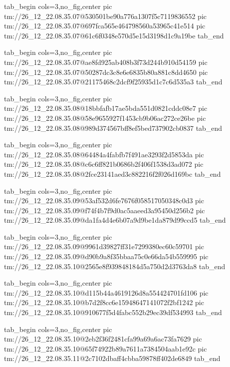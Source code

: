  
 
 
 
 

\qqSecCmtScr


\ifcmt
  tab_begin cols=3,no_fig,center
    pic tm://26_12_22.08.35.07@530501be90a776a1307f5c7119836552
    pic tm://26_12_22.08.35.07@697fca565e464798560a53965c41e514
    pic tm://26_12_22.08.35.07@61c6f0348e570d5e15d3198d1c9a19be
  tab_end
\fi


\ifcmt
  tab_begin cols=3,no_fig,center
    pic tm://26_12_22.08.35.07@ae8fd925ab408b3f73d244b910d54159
    pic tm://26_12_22.08.35.07@50287dc3c8e6e6835b80a881c8dd4650
    pic tm://26_12_22.08.35.07@21175468c2dcf9f25935d1c7c6d535a3
  tab_end
\fi


\ifcmt
  tab_begin cols=3,no_fig,center
    pic tm://26_12_22.08.35.08@18bbfafb17ae5bda551d0821cddc08e7
    pic tm://26_12_22.08.35.08@58e9655927f1453cb9b06ac272ce26be
    pic tm://26_12_22.08.35.08@989d374567bff8ef5bed737902cb0837
  tab_end
\fi


\ifcmt
  tab_begin cols=3,no_fig,center
    pic tm://26_12_22.08.35.08@64484a4fabfb7f491ae3293f2d5853da
    pic tm://26_12_22.08.35.08@c6c6ff821b0686b2f406f1538d3ad072
    pic tm://26_12_22.08.35.08@2fce23141aed3c882216f2f026d169bc
  tab_end
\fi


\ifcmt
  tab_begin cols=3,no_fig,center
    pic tm://26_12_22.08.35.09@53af532d6fe7676f058517050348c0d3
    pic tm://26_12_22.08.35.09@f74f4b7f9d0ac5aaeed3a95450d256b2
    pic tm://26_12_22.08.35.09@da1fa4d4e6b07a9d9be1da879d99ccd5
  tab_end
\fi


\ifcmt
  tab_begin cols=3,no_fig,center
    pic tm://26_12_22.08.35.09@9961d39827ff31e7299380ec60c59701
    pic tm://26_12_22.08.35.09@d90b9a8f35bbaa75c0e66da54b559995
    pic tm://26_12_22.08.35.10@2565e8f939848184d5a750d2d3763da8
  tab_end
\fi


\ifcmt
  tab_begin cols=3,no_fig,center
    pic tm://26_12_22.08.35.10@d115b44a4619126d8a554424701fd106
    pic tm://26_12_22.08.35.10@b7d2f8cc6e15948647141072f2bf1242
    pic tm://26_12_22.08.35.10@910677f5d4fabc552b29ec39df534993
  tab_end
\fi


\ifcmt
  tab_begin cols=3,no_fig,center
    pic tm://26_12_22.08.35.10@2eb2f36f2481cfa99a69a6ac73fa7629
    pic tm://26_12_22.08.35.10@65f74922b89a7611a7384504aab1e92c
    pic tm://26_12_22.08.35.11@2c7102dbaff4cbba59878ff402de6849
  tab_end
\fi


